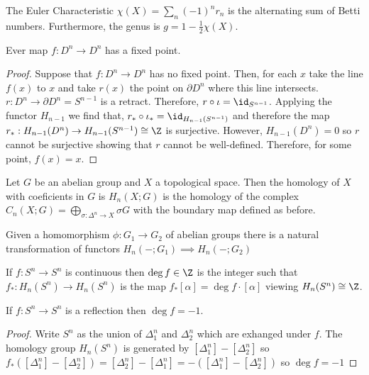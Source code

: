 \documentclass[12pt]{extarticle}
\begin{document}
\begin{definition}
The Euler Characteristic $\chi(X) = \sum_{n} (-1)^n r_n$ is the alternating sum of Betti numbers. Furthermore, the genus is $g = 1 - \tfrac{1}{2} \chi(X)$.
\end{definition}

\begin{theorem}[Brouwer]
Ever map $f : D^n \to D^n$ has a fixed point.
\end{theorem}

\begin{proof}
Suppose that $f : D^n \to D^n$ has no fixed point. Then, for each $x$ take the line $f(x)$ to $x$ and take $r(x)$ the point on $\partial D^n$ where this line intersects. $r : D^n \to \partial D^n = S^{n-1}$ is a retract. Therefore, $r \circ \iota = \id_{S^{n-1}}$. Applying the functor $H_{n-1}$ we find that, $r_* \circ \iota_* = \id_{H_{n-1}(S^{n-1})}$ and therefore the map $r_* : H_{n-1}(D^n) \to H_{n-1}(S^{n-1}) \cong \Z$ is surjective. However, $H_{n-1}(D^n) = 0$ so $r$ cannot be surjective showing that $r$ cannot be well-defined. Therefore, for some point, $f(x) = x$. 
\end{proof}

\begin{definition}
Let $G$ be an abelian group and $X$ a topological space. Then the homology of $X$ with coeficients in $G$ is $H_n(X; G)$ is the homology of the complex $C_n(X; G) = \bigoplus\limits_{\sigma : \Delta^n \to X} \sigma G$ with the boundary map defined as before. 
\end{definition}

\begin{lemma}
Given a homomorphism $\phi : G_1 \to G_2$ of abelian groups there is a natural transformation of functors $H_n( - ; G_1) \implies H_n(- ; G_2)$
\end{lemma}

\begin{definition}
If $f : S^n \to S^n$ is continuous then $\deg{f} \in \Z$ is the integer such that $f_* : H_n(S^n) \to H_n(S^n)$ is the map $f_* [\alpha] = \deg{f} \cdot [\alpha]$ viewing $H_n(S^n) \cong \Z$. 
\end{definition}

\begin{proposition}
If $f : S^n \to S^n$ is a reflection then $\deg{f} = -1$. 
\end{proposition}

\begin{proof}
Write $S^n$ as the union of $\Delta^n_1$ and $\Delta^n_2$ which are exhanged under $f$. The homology group $H_n(S^n)$ is generated by $[\Delta_1^n] - [\Delta_2^n]$ so $f_*([\Delta_1^n] - [\Delta_2^n]) = [\Delta_2^n] - [\Delta_1^n] = - ([\Delta_1^n] - [\Delta_2^n]) $
so $\deg{f} = -1$ 
\end{proof}
\end{document}
